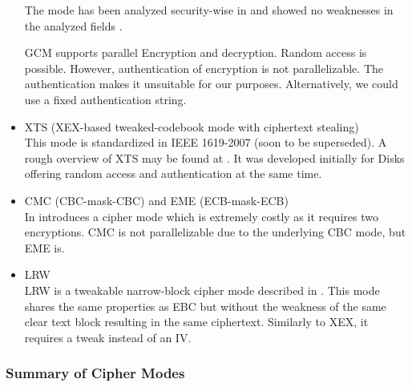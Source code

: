 \begin{itemize}
	The mode has been analyzed security-wise in \citeyear{mcgrew2004security} and showed no weaknesses in the analyzed fields \cite{mcgrew2004security}. 
	
	GCM supports parallel Encryption and decryption. Random access is possible. However, authentication of encryption is not parallelizable. The authentication makes it unsuitable for our purposes. Alternatively, we could use a fixed authentication string.
	\item XTS (XEX-based tweaked-codebook mode with ciphertext stealing)\\
	This mode is standardized in IEEE 1619-2007 (soon to be superseded). A rough overview of XTS may be found at \cite{Martin2010}. It was developed initially for Disks offering random access and authentication at the same time. 
	\item CMC (CBC-mask-CBC) and EME (ECB-mask-ECB)\\ 
	In \cite{Halevi:2003} \citeauthor{Halevi:2003} introduces a cipher mode which is extremely costly as it requires two encryptions. CMC is not parallelizable due to the underlying CBC mode, but EME is. 
	\item LRW\\
	LRW is a tweakable narrow-block cipher mode described in \cite{tschorsch:translayeranon}. This mode shares the same properties as EBC but without the weakness of the same clear text block resulting in the same ciphertext. Similarly to XEX, it requires a tweak instead of an IV.
\end{itemize}

\subsubsection{Summary of Cipher Modes}

